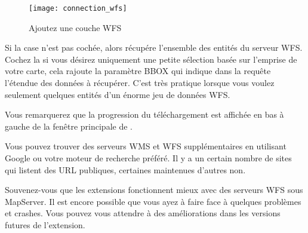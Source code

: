 \begin{figure}[ht]
    \centering
    \caption{Ajoutez une couche WFS \nixcaption}\label{fig:wfs_dmsolutions}
    \texttt{[image: connection\_wfs]}
\end{figure}



Si la case  n'est pas cochée, alors \qg récupére l'ensemble des entités du serveur WFS. Cochez la si vous désirez uniquement une petite sélection basée sur l'emprise de votre carte, cela rajoute la paramètre BBOX qui indique dans la requête l'étendue des données à récupérer. C'est très pratique lorsque vous voulez seulement quelques entités d'un énorme jeu de données WFS.

Vous remarquerez que la progression du téléchargement est affichée en bas à
gauche de la fenêtre principale de \qg.
\begin{Tip}[htb]\caption{\textsc{Trouver des serveurs WMS et WFS}}
Vous pouvez trouver des serveurs WMS et WFS supplémentaires en utilisant Google ou votre moteur de recherche préféré. Il y a un certain nombre de sites qui listent des URL publiques, certaines maintenues d'autres non. 
\end{Tip}
Souvenez-vous que les extensions fonctionnent mieux avec des serveurs WFS sous MapServer. Il est encore possible que vous ayez à faire face à quelques problèmes et crashes. Vous pouvez vous attendre à des améliorations dans les versions futures de l'extension.

